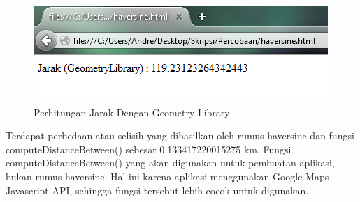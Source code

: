 \begin{figure}[h]
\centering
\includegraphics[scale=1]{Gambar/analisis_geometry}
\caption[Perhitungan Jarak Dengan Geometry Library]{Perhitungan Jarak Dengan
Geometry Library}
\label{fig:analisis_geometry}
\end{figure}
Terdapat perbedaan atau selisih yang dihasilkan oleh rumus haversine dan
fungsi computeDistanceBetween() sebesar 0.133417220015275 km. Fungsi 
computeDistanceBetween() yang akan digunakan untuk pembuatan aplikasi, bukan
rumus haversine. Hal ini karena aplikasi menggunakan Google Maps Javascript
API, sehingga fungsi tersebut lebih cocok untuk digunakan.

